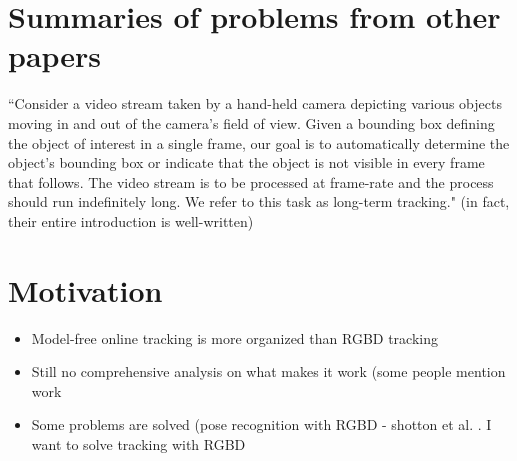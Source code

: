 \section{Summaries of problems from other papers}
``Consider a video stream taken by a hand-held camera depicting various objects moving in and out of the camera’s field of
view. Given a bounding box defining the object of interest
in a single frame, our goal is to automatically determine
the object’s bounding box or indicate that the object is not
visible in every frame that follows. The video stream is to be
processed at frame-rate and the process should run indefinitely
long. We refer to this task as long-term tracking." \cite{kalal2012tracking} (in fact, their entire introduction is well-written)

\section{Motivation}
\begin{itemize}
  \item Model-free online tracking is more organized than RGBD tracking
  \item Still no comprehensive analysis on what makes it work (some people mention work
  \item Some problems are solved (pose recognition with RGBD - shotton et al. \cite{shotton2013real}. I want to solve tracking with RGBD
\end{itemize}
